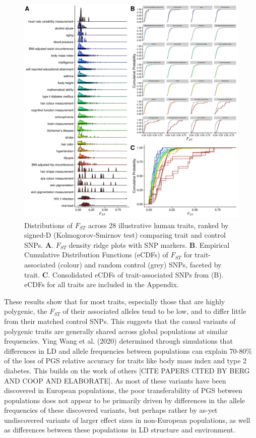 \documentclass[
]{book}
\begin{document}
\begin{figure}
\includegraphics[width=1\linewidth]{figs/fst/0.1_1000_20220314_final} \caption{Distributions of \(F_{ST}\) across 28 illustrative human traits, ranked by signed-D (Kolmogorov-Smirnov test) comparing trait and control SNPs. \textbf{A}. \(F_{ST}\) density ridge plots with SNP markers. \textbf{B}. Empirical Cumulative Distribution Functions (eCDFs) of \(F_{ST}\) for trait-associated (colour) and random control (grey) SNPs, faceted by trait. \textbf{C}. Consolidated eCDFs of trait-associated SNPs from (B). eCDFs for all traits are included in the Appendix.}\label{fig:FstMain}
\end{figure}

These results show that for most traits, especially those that are highly polygenic, the \(F_{ST}\) of their associated alleles tend to be low, and to differ little from their matched control SNPs. This suggests that the causal variants of polygenic traits are generally shared across global populations at similar frequencies. Ying Wang et al. (2020) determined through simulations that differences in LD and allele frequencies between populations can explain 70-80\% of the loss of PGS relative accuracy for traits like body mass index and type 2 diabetes. This builds on the work of others {[}CITE PAPERS CITED BY BERG AND COOP AND ELABORATE{]}. As most of these variants have been discovered in European populations, the poor transferability of PGS between populations does not appear to be primarily driven by differences in the allele frequencies of these discovered variants, but perhaps rather by as-yet undiscovered variants of larger effect sizes in non-European populations, as well as differences between these populations in LD structure and environment.
\end{document}
